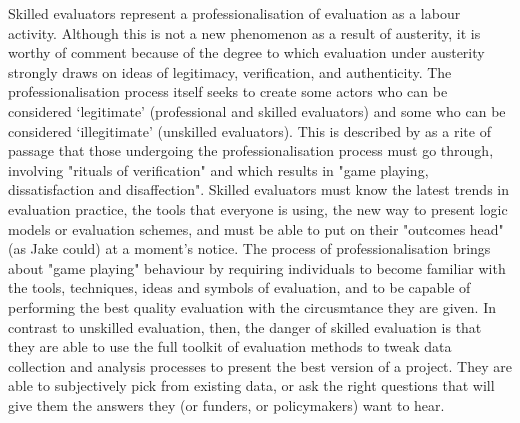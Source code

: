 Skilled evaluators represent a professionalisation of evaluation as a labour activity. Although this is not a new phenomenon as a result of austerity, it is worthy of comment because of the degree to which evaluation under austerity strongly draws on ideas of legitimacy, verification, and authenticity. The professionalisation process itself seeks to create some actors who can be considered `legitimate' (professional and skilled evaluators) and some who can be considered `illegitimate' (unskilled evaluators). This is described by \citet[p. 796]{oconnell_paperwork_2011} as a rite of passage that those undergoing the professionalisation process must go through, involving "rituals of verification" and which results in "game playing, dissatisfaction and disaffection". Skilled evaluators must know the latest trends in evaluation practice, the tools that everyone is using, the new way to present logic models or evaluation schemes, and must be able to put on their "outcomes head" (as Jake could) at a moment's notice. The process of professionalisation brings about "game playing" behaviour by requiring individuals to become familiar with the tools, techniques, ideas and symbols of evaluation, and to be capable of performing the best quality evaluation with the circusmtance they are given. In contrast to unskilled evaluation, then, the danger of skilled evaluation is that they are able to use the full toolkit of evaluation methods to tweak data collection and analysis processes to present the best version of a project. They are able to subjectively pick from existing data, or ask the right questions that will give them the answers they (or funders, or policymakers) want to hear.

